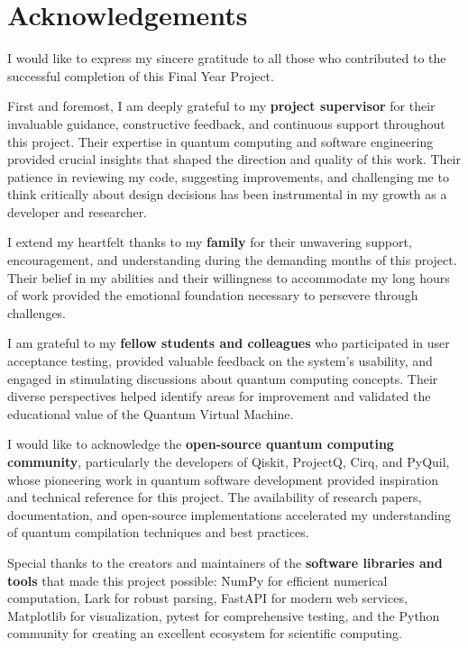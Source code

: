 
\chapter*{Acknowledgements}

I would like to express my sincere gratitude to all those who contributed to the successful completion of this Final Year Project.

First and foremost, I am deeply grateful to my \textbf{project supervisor} for their invaluable guidance, constructive feedback, and continuous support throughout this project. Their expertise in quantum computing and software engineering provided crucial insights that shaped the direction and quality of this work. Their patience in reviewing my code, suggesting improvements, and challenging me to think critically about design decisions has been instrumental in my growth as a developer and researcher.

I extend my heartfelt thanks to my \textbf{family} for their unwavering support, encouragement, and understanding during the demanding months of this project. Their belief in my abilities and their willingness to accommodate my long hours of work provided the emotional foundation necessary to persevere through challenges.

I am grateful to my \textbf{fellow students and colleagues} who participated in user acceptance testing, provided valuable feedback on the system's usability, and engaged in stimulating discussions about quantum computing concepts. Their diverse perspectives helped identify areas for improvement and validated the educational value of the Quantum Virtual Machine.

I would like to acknowledge the \textbf{open-source quantum computing community}, particularly the developers of Qiskit, ProjectQ, Cirq, and PyQuil, whose pioneering work in quantum software development provided inspiration and technical reference for this project. The availability of research papers, documentation, and open-source implementations accelerated my understanding of quantum compilation techniques and best practices.

Special thanks to the creators and maintainers of the \textbf{software libraries and tools} that made this project possible: NumPy for efficient numerical computation, Lark for robust parsing, FastAPI for modern web services, Matplotlib for visualization, pytest for comprehensive testing, and the Python community for creating an excellent ecosystem for scientific computing.


